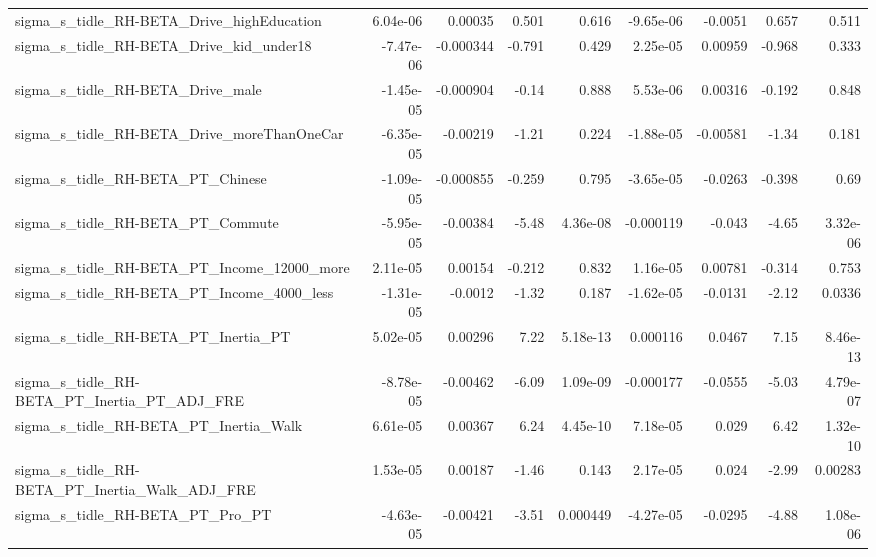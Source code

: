 \begin{tabular}{lrrrrrrrr}
sigma\_s\_tidle\_RH-BETA\_Drive\_highEducation          &    6.04e-06 &      0.00035 &    0.501 &    0.616 &  -9.65e-06 &     -0.0051 &        0.657 &         0.511 \\
sigma\_s\_tidle\_RH-BETA\_Drive\_kid\_under18            &   -7.47e-06 &    -0.000344 &   -0.791 &    0.429 &   2.25e-05 &     0.00959 &       -0.968 &         0.333 \\
sigma\_s\_tidle\_RH-BETA\_Drive\_male                   &   -1.45e-05 &    -0.000904 &    -0.14 &    0.888 &   5.53e-06 &     0.00316 &       -0.192 &         0.848 \\
sigma\_s\_tidle\_RH-BETA\_Drive\_moreThanOneCar         &   -6.35e-05 &     -0.00219 &    -1.21 &    0.224 &  -1.88e-05 &    -0.00581 &        -1.34 &         0.181 \\
sigma\_s\_tidle\_RH-BETA\_PT\_Chinese                   &   -1.09e-05 &    -0.000855 &   -0.259 &    0.795 &  -3.65e-05 &     -0.0263 &       -0.398 &          0.69 \\
sigma\_s\_tidle\_RH-BETA\_PT\_Commute                   &   -5.95e-05 &     -0.00384 &    -5.48 & 4.36e-08 &  -0.000119 &      -0.043 &        -4.65 &      3.32e-06 \\
sigma\_s\_tidle\_RH-BETA\_PT\_Income\_12000\_more         &    2.11e-05 &      0.00154 &   -0.212 &    0.832 &   1.16e-05 &     0.00781 &       -0.314 &         0.753 \\
sigma\_s\_tidle\_RH-BETA\_PT\_Income\_4000\_less          &   -1.31e-05 &      -0.0012 &    -1.32 &    0.187 &  -1.62e-05 &     -0.0131 &        -2.12 &        0.0336 \\
sigma\_s\_tidle\_RH-BETA\_PT\_Inertia\_PT                &    5.02e-05 &      0.00296 &     7.22 & 5.18e-13 &   0.000116 &      0.0467 &         7.15 &      8.46e-13 \\
sigma\_s\_tidle\_RH-BETA\_PT\_Inertia\_PT\_ADJ\_FRE        &   -8.78e-05 &     -0.00462 &    -6.09 & 1.09e-09 &  -0.000177 &     -0.0555 &        -5.03 &      4.79e-07 \\
sigma\_s\_tidle\_RH-BETA\_PT\_Inertia\_Walk              &    6.61e-05 &      0.00367 &     6.24 & 4.45e-10 &   7.18e-05 &       0.029 &         6.42 &      1.32e-10 \\
sigma\_s\_tidle\_RH-BETA\_PT\_Inertia\_Walk\_ADJ\_FRE      &    1.53e-05 &      0.00187 &    -1.46 &    0.143 &   2.17e-05 &       0.024 &        -2.99 &       0.00283 \\
sigma\_s\_tidle\_RH-BETA\_PT\_Pro\_PT                    &   -4.63e-05 &     -0.00421 &    -3.51 & 0.000449 &  -4.27e-05 &     -0.0295 &        -4.88 &      1.08e-06 \\

\end{tabular}

